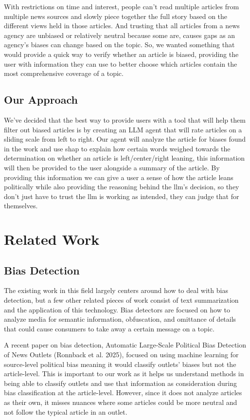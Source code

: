 \documentclass{article}
\begin{document}
With restrictions on time and interest, people can’t read multiple articles from multiple news sources and slowly piece together the full story based on the different views held in those articles. And trusting that all articles from a news agency are unbiased or relatively neutral because some are, causes gaps as an agency’s biases can change based on the topic. So, we wanted something that would provide a quick way to verify whether an article is biased, providing the user with information they can use to better choose which articles contain the most comprehensive coverage of a topic.

\subsection{Our Approach}

We’ve decided that the best way to provide users with a tool that will help them filter out biased articles is by creating an LLM agent that will rate articles on a sliding scale from left to right. Our agent will analyze the article for biases found in the work and use shap to explain how certain words weighed towards the determination on whether an article is left/center/right leaning, this information will then be provided to the user alongside a summary of the article. By providing this information we can give a user a sense of how the article leans politically while also providing the reasoning behind the llm’s decision, so they don’t just have to trust the llm is working as intended, they can judge that for themselves.

\section{Related Work}

\subsection{Bias Detection}

The existing work in this field largely centers around how to deal with bias detection, but a few other related pieces of work consist of text summarization and the application of this technology. Bias detectors are focused on how to analyze media for semantic information, obfuscation, and omittance of details that could cause consumers to take away a certain message on a topic.

A recent paper on bias detection, Automatic Large-Scale Political Bias Detection of News Outlets (Ronnback et al. 2025), focused on using machine learning for source-level political bias meaning it would classify outlets' biases but not the article-level. This is important to our work as it helps us understand methods in being able to classify outlets and use that information as consideration during bias classification at the article-level. However, since it does not analyze articles as their own, it misses nuances where some articles could be more neutral and not follow the typical article in an outlet.
\end{document}
